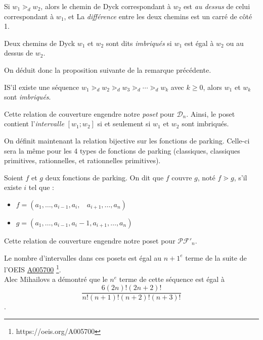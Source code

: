 \begin{rem}
    Si $w_1 \gtrdot_d w_2$, alors le chemin de Dyck correspondant à $w_2$
    est \emph{au dessus} de celui correspondant à $w_1$, et La
    \emph{différence} entre les deux chemins est un carré de côté 1.
\end{rem}

\begin{definition}
    Deux chemins de Dyck $w_1$ et $w_2$ sont dits \emph{imbriqués}
    si $w_1$ est égal à $w_2$ ou au dessus de $w_2$. 
\end{definition}

On déduit donc la proposition suivante de la remarque précédente.

\begin{prop}
    IS'il existe une séquence $w_1 \gtrdot_d w_2 \gtrdot_d
    w_3 \gtrdot_d \cdots \gtrdot_d w_k$ avec $k \geqslant 0$,
    alors $w_1$ et $w_k$ sont \emph{imbriqués}.
\end{prop}

Cette relation de couverture engendre notre \emph{poset} pour
$\mathcal{D}_n$.
Ainsi, le poset contient l'\emph{intervalle} $[w_1;w_2]$ si et seulement
si $w_1$ et $w_2$ sont imbriqués.

On définit maintenant la relation bijective sur les fonctions de parking.
Celle-ci sera la même pour les 4 types de fonctions de parking (classiques,
classiques primitives, rationnelles, et rationnelles primitives).

\begin{definition}[$\gtrdot$]
    Soient $f$ et $g$ deux fonctions de parking.
    On dit que $f$ couvre $g$, noté $f \gtrdot g$, s'il existe $i$ tel que :
    \begin{itemize}
        \item $f = (a_1, \ldots, a_{i-1}, a_i,\ \ \ \ 
            a_{i+1}, \ldots, a_n)$
        \item $g = (a_1, \ldots, a_{i-1}, a_i - 1, a_{i+1},
        \ldots, a_n)$
    \end{itemize}
\end{definition}

Cette relation de couverture engendre notre poset pour $\mathcal{PF'}_n$.

\begin{theorem}
    Le nombre d'intervalles dans ces posets est égal au $n+1^{e}$ terme
    de la suite de l'OEIS 
    \href{https://oeis.org/A005700}{A005700}
    \footnote{https://oeis.org/A005700}.\\
    Alec Mihailovs a démontré que le $n^{e}$ terme de cette séquence est
    égal à $$\frac {6 (2n)! (2n+2)!}{n!(n+1)!(n+2)!(n+3)!}$$.
\end{theorem}

